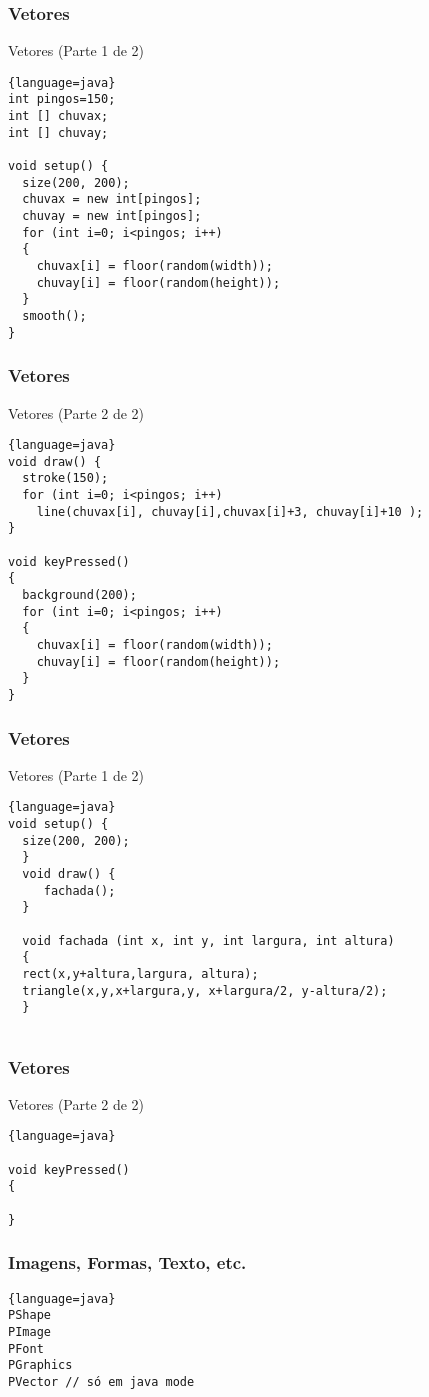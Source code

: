 \documentclass{beamer}
\begin{document}
\begin{frame}[fragile]
\frametitle{Vetores}
Vetores (Parte 1 de 2)
\begin{lstlisting}{language=java}
int pingos=150; 
int [] chuvax;
int [] chuvay;

void setup() {
  size(200, 200);
  chuvax = new int[pingos];
  chuvay = new int[pingos];
  for (int i=0; i<pingos; i++)
  {
    chuvax[i] = floor(random(width));
    chuvay[i] = floor(random(height));
  }
  smooth();
}
\end{lstlisting}
\end{frame}

\begin{frame}[fragile]
\frametitle{Vetores}
Vetores (Parte 2 de 2)
\begin{lstlisting}{language=java}
void draw() {
  stroke(150);
  for (int i=0; i<pingos; i++)
    line(chuvax[i], chuvay[i],chuvax[i]+3, chuvay[i]+10 );
}

void keyPressed()
{
  background(200);
  for (int i=0; i<pingos; i++)
  {
    chuvax[i] = floor(random(width));
    chuvay[i] = floor(random(height));
  }
}
\end{lstlisting}
\end{frame}

\begin{frame}[fragile]
\frametitle{Vetores}
Vetores (Parte 1 de 2)
\begin{lstlisting}{language=java}
void setup() {
  size(200, 200);
  }
  void draw() {
     fachada();
  }

  void fachada (int x, int y, int largura, int altura)
  {
  rect(x,y+altura,largura, altura);
  triangle(x,y,x+largura,y, x+largura/2, y-altura/2);
  }
  
\end{lstlisting}
\end{frame}

\begin{frame}[fragile]
\frametitle{Vetores}
Vetores (Parte 2 de 2)
\begin{lstlisting}{language=java}

void keyPressed()
{
 
}
\end{lstlisting}
\end{frame}





\begin{frame}[fragile]
\frametitle{Imagens, Formas, Texto, etc.}
\begin{lstlisting}{language=java}
PShape 
PImage
PFont
PGraphics
PVector // só em java mode
\end{lstlisting}
\end{frame}
\end{document}
